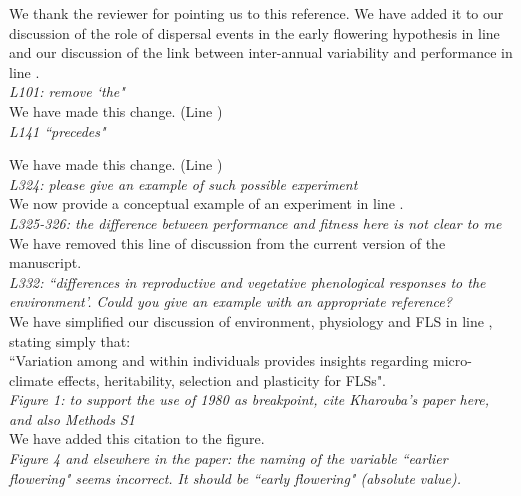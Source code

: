 \documentclass{article}[11pt]
\begin{document}
\noindent We thank the reviewer for pointing us to this reference. We have added it to our discussion of the role of dispersal events in the early flowering hypothesis in line  and our discussion of the link between inter-annual variability and performance in line .\\
 
\emph{L101: remove `the"}\\

We have made this change. (Line )\\

\emph{L141 ``precedes"}

We have made this change. (Line )\\

\emph{L324: please give an example of such possible experiment}\\

\noindent We now provide a conceptual example of an experiment in line .\\

\emph{L325-326: the difference between performance and fitness here is not clear to me}\\

\noindent We have removed this line of discussion from the current version of the manuscript.\\

\emph{L332: ``differences in reproductive and vegetative phenological responses to the environment'. Could you give an example with an appropriate reference?}\\

\noindent We have simplified our discussion of environment, physiology and FLS in line , stating simply that:\\
\indent ``Variation among and within individuals provides insights regarding  micro-climate effects, heritability, selection and plasticity for FLSs".\\

\emph{Figure 1: to support the use of 1980 as breakpoint, cite Kharouba's paper here, and also Methods S1}\\

\noindent We have added this citation to the figure.\\

\emph{Figure 4 and elsewhere in the paper: the naming of the variable ``earlier flowering" seems incorrect. It should be ``early flowering" (absolute value).}\\
\end{document}
